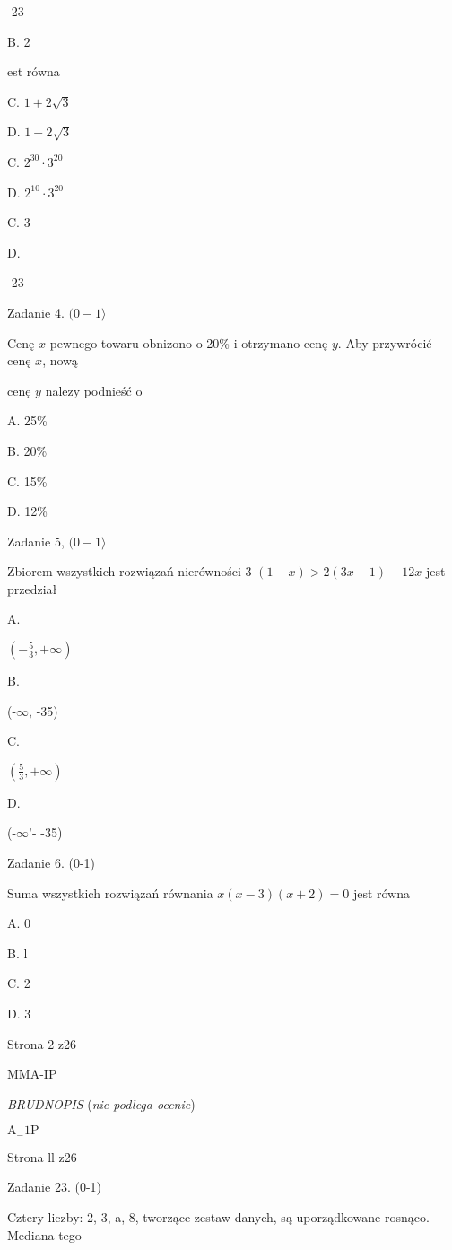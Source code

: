 \documentclass[a4paper,12pt]{article}
\begin{document}
-23

B. 2

est równa

C. $1+2\sqrt{3}$

D. $1-2\sqrt{3}$

C. $2^{30}\cdot 3^{20}$

D. $2^{10}\cdot 3^{20}$

C. 3

D.

-23

Zadanie 4. $(0-1\rangle$

Cenę $x$ pewnego towaru obnizono o 20\% i otrzymano cenę $y$. Aby przywrócić cenę $x$, nową

cenę $y$ nalezy podnieść o

A. 25\%

B. 20\%

C. 15\%

D. 12\%

Zadanie 5, $(0-1\rangle$

Zbiorem wszystkich rozwiązań nierówności 3 $(1-x)>2(3x-1)-12x$ jest przedział

A.

$(-\displaystyle \frac{5}{3},+\infty)$

B.

(-$\infty$, -35)

C.

$(\displaystyle \frac{5}{3},+\infty)$

D.

(-$\infty$'- -35)

Zadanie 6. (0-1)

Suma wszystkich rozwiązań równania $x(x-3)(x+2)=0$ jest równa

A. 0

B. l

C. 2

D. 3

Strona 2 z26

MMA-IP





{\it BRUDNOPIS} ({\it nie podlega ocenie})

$\mathrm{A}_{-}1\mathrm{P}$

Strona ll z26





Zadanie 23. (0-1)

Cztery liczby: 2, 3, a, 8, tworzące zestaw danych, są uporządkowane rosnąco. Mediana tego
\end{document}
